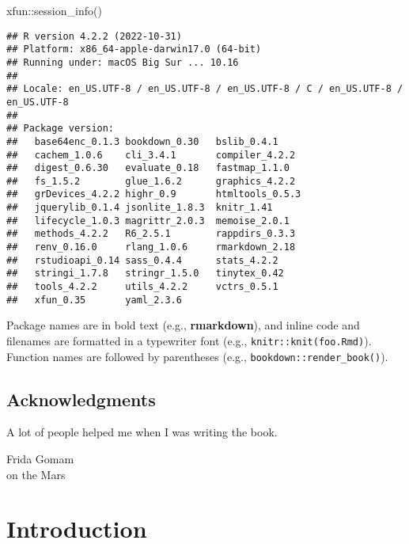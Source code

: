 \documentclass[
]{krantz}
\makeatletter
\newenvironment{Shaded}{\begin{snugshade}}{\end{snugshade}}
\newcommand{\FunctionTok}[1]{\textcolor[rgb]{0,0,0}{#1}}
\newcommand{\NormalTok}[1]{#1}
\newcommand{\SpecialCharTok}[1]{\textcolor[rgb]{0,0,0}{#1}}
\newenvironment{kframe}{%
\medskip{}
\setlength{\fboxsep}{.8em}
 \def\at@end@of@kframe{}%
 \ifinner\ifhmode%
  \def\at@end@of@kframe{\end{minipage}}%
  \begin{minipage}{\columnwidth}%
 \fi\fi%
 \def\FrameCommand##1{\hskip\@totalleftmargin \hskip-\fboxsep
 \colorbox{shadecolor}{##1}\hskip-\fboxsep
     \hskip-\linewidth \hskip-\@totalleftmargin \hskip\columnwidth}%
 \MakeFramed {\advance\hsize-\width
   \@totalleftmargin\z@ \linewidth\hsize
   \@setminipage}}%
 {\par\unskip\endMakeFramed%
 \at@end@of@kframe}
\renewenvironment{Shaded}{\begin{kframe}}{\end{kframe}}
\makeatother
\begin{document}
\begin{Shaded}
\begin{Highlighting}[]
\NormalTok{xfun}\SpecialCharTok{::}\FunctionTok{session\_info}\NormalTok{()}
\end{Highlighting}
\end{Shaded}

\begin{verbatim}
## R version 4.2.2 (2022-10-31)
## Platform: x86_64-apple-darwin17.0 (64-bit)
## Running under: macOS Big Sur ... 10.16
## 
## Locale: en_US.UTF-8 / en_US.UTF-8 / en_US.UTF-8 / C / en_US.UTF-8 / en_US.UTF-8
## 
## Package version:
##   base64enc_0.1.3 bookdown_0.30   bslib_0.4.1    
##   cachem_1.0.6    cli_3.4.1       compiler_4.2.2 
##   digest_0.6.30   evaluate_0.18   fastmap_1.1.0  
##   fs_1.5.2        glue_1.6.2      graphics_4.2.2 
##   grDevices_4.2.2 highr_0.9       htmltools_0.5.3
##   jquerylib_0.1.4 jsonlite_1.8.3  knitr_1.41     
##   lifecycle_1.0.3 magrittr_2.0.3  memoise_2.0.1  
##   methods_4.2.2   R6_2.5.1        rappdirs_0.3.3 
##   renv_0.16.0     rlang_1.0.6     rmarkdown_2.18 
##   rstudioapi_0.14 sass_0.4.4      stats_4.2.2    
##   stringi_1.7.8   stringr_1.5.0   tinytex_0.42   
##   tools_4.2.2     utils_4.2.2     vctrs_0.5.1    
##   xfun_0.35       yaml_2.3.6
\end{verbatim}

Package names are in bold text (e.g., \textbf{rmarkdown}), and inline code and filenames are formatted in a typewriter font (e.g., \texttt{knitr::knit(\textquotesingle{}foo.Rmd\textquotesingle{})}). Function names are followed by parentheses (e.g., \texttt{bookdown::render\_book()}).

\hypertarget{acknowledgments}{%
\section*{Acknowledgments}\label{acknowledgments}}


A lot of people helped me when I was writing the book.

\begin{flushright}
Frida Gomam\\
on the Mars
\end{flushright}

\mainmatter

\hypertarget{c01}{%
\chapter{Introduction}\label{c01}}
\end{document}
